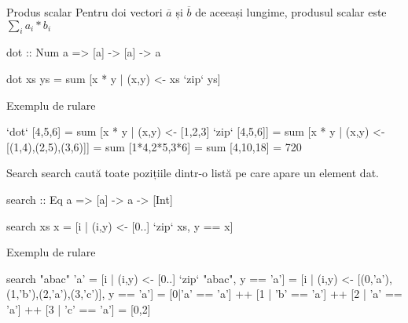 \documentclass[xcolor=pdftex,romanian,colorlinks]{beamer}
\begin{document}
\begin{frame}[fragile]{Produs scalar}
Pentru doi vectori $\overline{a}$ și $\overline{b}$ de aceeași lungime,
produsul scalar este $\displaystyle\sum_i a_i*b_i$
\begin{asciihs}
dot :: Num a => [a] -> [a] -> a
\end{asciihs}
\vspace{-2ex}
\begin{asciihs}
dot xs ys = sum [x * y | (x,y) <- xs `zip` ys]
\end{asciihs}

\begin{block}{Exemplu de rulare}
\begin{asciihs}
[1,2,3] `dot` [4,5,6] 
  = sum [x * y | (x,y) <- [1,2,3] `zip` [4,5,6]] 
  = sum [x * y | (x,y) <- [(1,4),(2,5),(3,6)]] 
  = sum [1*4,2*5,3*6] 
  = sum [4,10,18] 
  = 720
\end{asciihs}
\end{block}
\end{frame}

\begin{frame}[fragile]{Search}
search caută toate pozițiile dintr-o listă pe care apare un element dat.
\begin{asciihs}
search :: Eq a => [a] -> a -> [Int]
\end{asciihs}
\vspace{-2ex}
\begin{asciihs}
search xs x = [i | (i,y) <- [0..] `zip` xs, y == x]
\end{asciihs}

\begin{block}{Exemplu de rulare}
\begin{asciihs}
search "abac" 'a'
= [i | (i,y) <- [0..] `zip` "abac", y == 'a']
= [i | (i,y) <- [(0,'a'),(1,'b'),(2,'a'),(3,'c')], y == 'a']
= [0|'a' == 'a'] ++ [1 | 'b' == 'a'] ++ [2 | 'a' == 'a'] ++ [3 | 'c' == 'a']
= [0,2]
\end{asciihs}
\end{block}
\end{frame}
\end{document}
